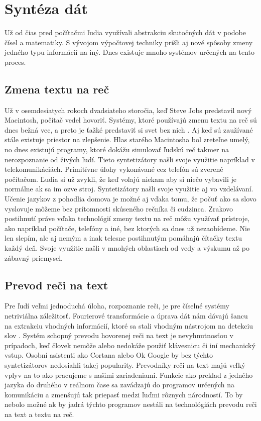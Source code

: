 
\chapter{Syntéza dát}
\label{synteza_dat}

Už od čias pred počítačmi ľudia využívali abstrakciu skutočných dát v podobe čísel a matematiky. S vývojom výpočtovej techniky prišli aj nové spôsoby zmeny jedného typu informácií na iný. Dnes existuje mnoho systémov určených na tento proces.

\section{Zmena textu na reč}
Už v osemdesiatych rokoch dvadsiateho storočia, keď Steve Jobs predstavil nový Macintosh, počítač vedel hovoriť.
Systémy, ktoré používajú zmenu textu na reč sú dnes bežná vec, a preto je ťažké predstaviť si svet bez nich \cite{text2speech}.
Aj keď sú zaužívané stále existuje priestor na zlepšenie. Hlas starého Macintosha bol zreteľne umelý, no dnes existujú programy, ktoré dokážu simulovať ľudskú reč takmer na nerozpoznanie od živých ľudí.
Tieto syntetizátory našli svoje využitie napríklad v telekomunikáciách.
Primitívne úlohy vykonávané cez telefón sú zverené počítačom.
Ľudia si už zvykli, že keď volajú niekam aby si niečo vybavili je normálne ak sa im ozve stroj.
Syntetizátory našli svoje využitie aj vo vzdelávaní.
Učenie jazykov z pohodlia domova je možné aj vďaka tomu, že počuť ako sa slovo vyslovuje môžeme bez prítomnosti skúseného rečníka či cudzinca.
Zrakovo postihnutí práve vďaka technológií zmeny textu na reč môžu využívať prístroje, ako napríklad počítače, telefóny a iné,  bez ktorých sa dnes už nezaobídeme.
Nie len slepím, ale aj nemým a inak telesne postihnutým pomáhajú čítačky textu každý deň. Svoje využitie našli v mnohých oblastiach od vedy a výskumu až po zábavný priemysel.

\section{Prevod reči na text}
Pre ľudí veľmi jednoduchá úloha, rozpoznanie reči, je pre číselné systémy netriviálna záležitosť.
Fourierové transformácie a úprava dát nám dávajú šancu na extrakciu vhodných informácií, ktoré sa stali vhodným nástrojom na detekciu slov \cite{speechRecognition}.
Systém schopný prevodu hovorenej reči na text je nevyhnutnosťou v prípadoch, keď človek nemôže alebo nedokáže použiť klávesnicu či iní mechanický vstup.
Osobní asistenti ako Cortana alebo Ok Google by bez týchto syntetizátorov nedosiahli takej popularity.
Prevodníky reči na text majú veľký vplyv na to ako pracujeme s našimi zariadeniami. Funkcie ako preklad z jedného jazyka do druhého v reálnom čase sa zavádzajú do programov určených na komunikáciu a zmenšujú tak priepasť medzi ľuďmi rôznych národností.
To by nebolo možné ak by jadrá týchto programov nestáli na technológiách prevodu reči na text a textu na reč.

